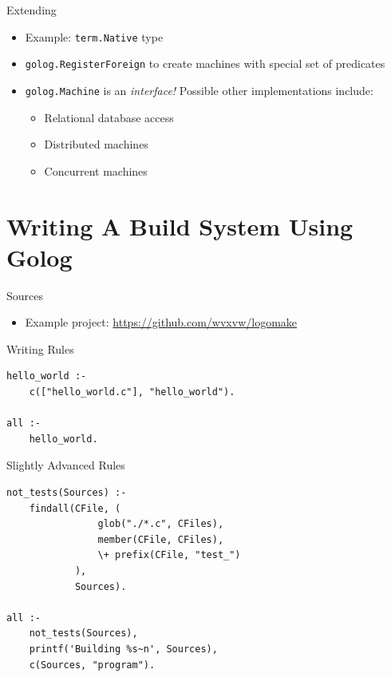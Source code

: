 \documentclass[presentation]{beamer}
\begin{document}
\begin{frame}[fragile,label=sec-3-9]{Extending}
 \begin{itemize}
\item Example: \texttt{term.Native} type
\item \texttt{golog.RegisterForeign} to create machines with special set of
predicates
\item \texttt{golog.Machine} is an \emph{interface!} Possible other implementations
include:
\begin{itemize}
\item Relational database access
\item Distributed machines
\item Concurrent machines
\end{itemize}
\end{itemize}
\end{frame}

\section{Writing A Build System Using Golog}
\label{sec-4}

\begin{frame}[label=sec-4-1]{Sources}
\begin{itemize}
\item Example project: \url{https://github.com/wvxvw/logomake}
\end{itemize}
\end{frame}

\begin{frame}[fragile,label=sec-4-2]{Writing Rules}
 \begin{verbatim}
hello_world :-
    c(["hello_world.c"], "hello_world").

all :-
    hello_world.
\end{verbatim}
\end{frame}

\begin{frame}[fragile,label=sec-4-3]{Slightly Advanced Rules}
 \begin{verbatim}
not_tests(Sources) :-
    findall(CFile, (
                glob("./*.c", CFiles),
                member(CFile, CFiles),
                \+ prefix(CFile, "test_")
            ),
            Sources).

all :-
    not_tests(Sources),
    printf('Building %s~n', Sources),
    c(Sources, "program").
\end{verbatim}
\end{frame}
\end{document}
